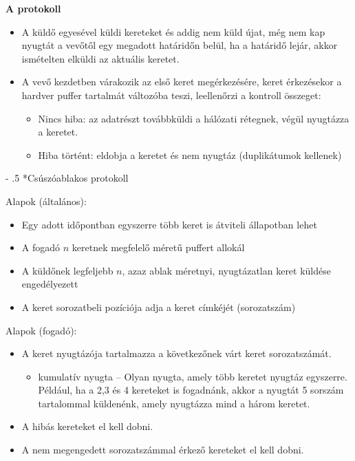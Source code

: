 \documentclass[12pt]{article}
\makeatletter
\renewcommand\paragraph{%
	\@startsection{paragraph}{4}{0mm}%
	{-\baselineskip}%
	{.5\baselineskip}%
	{\normalfont\normalsize\bfseries}}
\makeatother
\begin{document}
    \noindent \textbf{\small A protokoll}
    \begin{itemize}[leftmargin=7.5mm]
        \renewcommand{\labelitemi}{$\vcenter{\hbox{\tiny$\bullet$}}$}
    	\item A küldő egyesével küldi kereteket és addig nem küld újat, még nem kap nyugtát a vevőtől egy megadott határidőn belül, ha a határidő lejár, akkor ismételten elküldi az aktuális keretet.
    	\item A vevő kezdetben várakozik az első keret megérkezésére, keret érkezésekor a hardver puffer tartalmát változóba teszi, leellenőrzi a kontroll összeget:
    	\begin{itemize}
    		\item Nincs hiba: az adatrészt továbbküldi a hálózati rétegnek, végül nyugtázza a keretet.
    		\item Hiba történt: eldobja a keretet és nem nyugtáz (duplikátumok kellenek)
    	\end{itemize}
    \end{itemize}

    \paragraph*{Csúszóablakos protokoll}

    \noindent Alapok (általános):
    \begin{itemize}[leftmargin=7.5mm]
        \renewcommand{\labelitemi}{$\vcenter{\hbox{\tiny$\bullet$}}$}
        \item Egy adott időpontban egyszerre több keret is átviteli állapotban lehet
        \item A fogadó $n$ keretnek megfelelő méretű puffert allokál
        \item A küldőnek legfeljebb $n$, azaz ablak méretnyi, nyugtázatlan keret küldése engedélyezett
        \item A keret sorozatbeli pozíciója adja a keret címkéjét (sorozatszám)\\
    \end{itemize}

    \noindent Alapok (fogadó):
    \begin{itemize}[leftmargin=7.5mm]
        \renewcommand{\labelitemi}{$\vcenter{\hbox{\tiny$\bullet$}}$}
        \item A keret nyugtázója tartalmazza a következőnek várt keret sorozatszámát.
        \begin{itemize}[leftmargin=7.5mm]
            \renewcommand{\labelitemii}{$\vcenter{\hbox{\tiny$\circ$}}$}
            \item kumulatív nyugta – Olyan nyugta, amely több keretet nyugtáz egyszerre. Például, ha a 2,3 és 4 kereteket is fogadnánk, akkor a nyugtát 5 sorszám tartalommal küldenénk, amely nyugtázza mind a három keretet.
        \end{itemize}
        \item A hibás kereteket el kell dobni.
        \item A nem megengedett sorozatszámmal érkező kereteket el kell dobni.\\
    \end{itemize}
\end{document}
